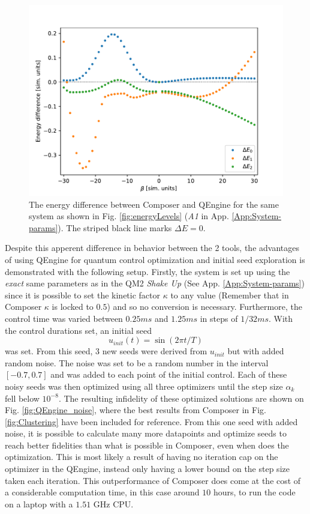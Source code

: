 \documentclass[a4paper, twocolumn]{revtex4-1}
\begin{document}
\begin{figure}
	\includegraphics[width=\columnwidth]{graphics/stateAnalysis/energyDiffQEngineComp.pdf}
	\caption{The energy difference between Composer and QEngine for the same system as shown in Fig. \ref{fig:energyLevels} (\textit{A1} in App. \ref{App:System-params}). The striped black line marks $\Delta E=0$.}
	\label{fig:QEngine_energydiff}
\end{figure}

Despite this apperent difference in behavior between the 2 tools, the advantages of using QEngine for quantum control optimization and initial seed exploration is demonstrated with the following setup. Firstly, the system is set up using the \textit{exact} same parameters as in the QM2 \textit{Shake Up} (See App. \ref{App:System-params}) since it is possible to set the kinetic factor $\kappa$ to any value (Remember that in Composer $\kappa$ is locked to $0.5$) and so no conversion is necessary. Furthermore, the control time was varied between $0.25 ms$ and $1.25 ms$ in steps of $1/32 ms$. With the control durations set, an initial seed 
\begin{equation}
	u_{init}(t) = \sin(2\pi t/T)
\end{equation}
was set. From this seed, 3 new seeds were derived from $u_{init}$ but with added random noise. The noise was set to be a random number in the interval $[-0.7, 0.7]$ and was added to each point of the initial control. Each of these noisy seeds was then optimized using all three optimizers until the step size $\alpha_k$ fell below $10^{-8}$. The resulting infidelity of these optimized solutions are shown on Fig. \ref{fig:QEngine_noise}, where the best results from Composer in Fig. \ref{fig:Clustering} have been included for reference. From this one seed with added noise, it is possible to calculate many more datapoints and optimize seeds to reach better fidelities than what is possible in Composer, even when  does the optimization. This is most likely a result of having no iteration cap on the optimizer in the QEngine, instead only having a lower bound on the step size taken each iteration. This outperformance of Composer does come at the cost of a considerable computation time, in this case around $10$ hours, to run the code on a laptop with a $1.51$ GHz CPU.
\end{document}
